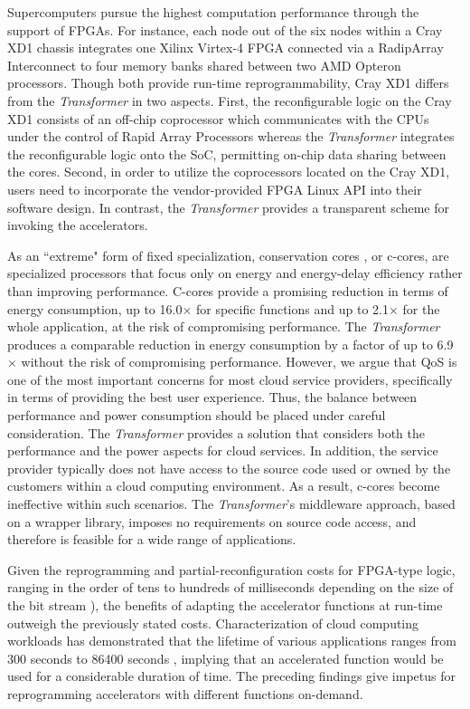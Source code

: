 Supercomputers pursue the highest computation performance
\cite{Ulmer:2005vh} through the support of FPGAs. For instance, each node
 out of the six nodes within a Cray XD1 chassis integrates one Xilinx Virtex-4 FPGA
connected via a RadipArray Interconnect to four memory banks shared
between two AMD Opteron processors. Though both provide run-time
reprogrammability, Cray XD1 differs from the {\em Transformer} in two
aspects.
First, the reconfigurable logic on the Cray XD1 consists of an off-chip
coprocessor which communicates with the CPUs under the control of Rapid
Array Processors whereas the {\em Transformer} integrates the reconfigurable
logic onto the SoC, permitting on-chip data sharing between the cores.
Second, in order to utilize the coprocessors located on the Cray XD1, users need to incorporate the
vendor-provided FPGA Linux API into their software design. In
contrast, the {\em Transformer} provides a transparent scheme for invoking
the accelerators.

As an ``extreme" form of fixed specialization, conservation cores
\cite{Venkatesh:2010:CCR:1735970.1736044,Venkatesh:2010:CCR:1736020.1736044,Venkatesh:2010:CCR:1735971.1736044},
or c-cores, are specialized processors that focus only on energy and
energy-delay efficiency rather than improving performance. C-cores
provide a promising reduction in terms of energy consumption, up to
16.0$\times$ for specific functions and up to 2.1$\times$ for the whole
application, at the risk of compromising performance.  The {\em Transformer} produces a comparable reduction in energy
consumption by a factor of up to 6.9$\times$ without the risk of compromising performance. 
However, we argue that QoS is one of the most important
concerns for most cloud service providers, specifically in terms of providing
the best user experience. Thus, the balance between performance and
power consumption should be placed under careful consideration. The {\em Transformer}
provides a solution that considers both the performance and the power aspects
for cloud services. In addition, the service provider typically does
not have access to the source code used or owned by the customers within a
cloud computing environment. As a result, c-cores become ineffective within such scenarios. The {\em Transformer}'s middleware approach, based on a wrapper library, imposes no requirements on source code access, and therefore is feasible for a wide range of applications. 

Given the reprogramming and partial-reconfiguration costs for FPGA-type
logic, ranging in the order of tens to hundreds of milliseconds depending on
the size of the bit stream \cite{Liu:2009ie}), the benefits of adapting
the accelerator functions at run-time outweigh the previously stated
costs. Characterization of cloud computing workloads has demonstrated that the lifetime of various
applications ranges from 300 seconds to 86400 seconds \cite{CloudWorkload}, implying that an
accelerated function would be used for a considerable duration of time. The preceding findings give impetus
for reprogramming accelerators with different
functions on-demand.

